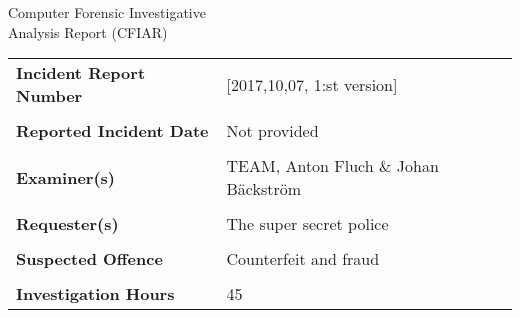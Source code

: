 


\setlength\headsep{50pt}
{\centering \Huge Computer Forensic Investigative \\Analysis Report (CFIAR)

}

\begin{longtable}{p{}p{}}
\textbf{Incident Report Number} & [2017,10,07, 1:st version] \\
&\\
\textbf{Reported Incident Date} & Not provided \\
&\\
\textbf{Examiner(s)} & TEAM, Anton Fluch \& Johan Bäckström \\
&\\
\textbf{Requester(s)} & The super secret police \\
&\\
\textbf{Suspected Offence} & Counterfeit and fraud \\
&\\
\textbf{Investigation Hours} & 45
\end{longtable}

\clearpage
